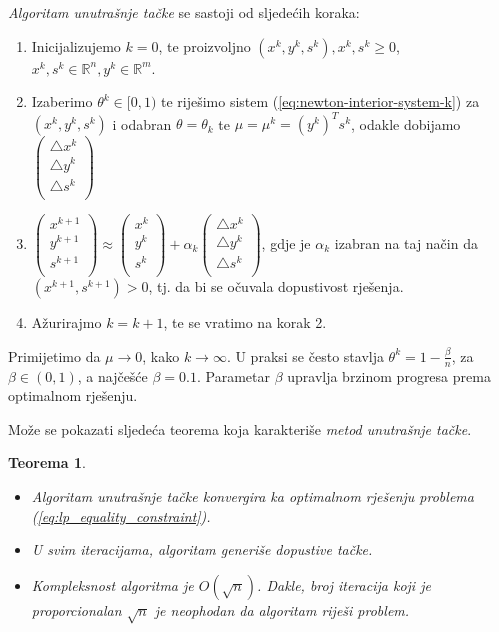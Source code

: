 \documentclass[a4paper, utf8, 11pt, colorlinks]{book}
\newtheorem{thm}{Teorema}
\begin{document}
\emph{Algoritam unutrašnje tačke} se sastoji od sljedećih koraka:
\begin{enumerate}
	\item Inicijalizujemo $k=0$, te proizvoljno  $(x^k, y^k, s^k), x^k, s^k \geq 0$, $x^k,s^k \in \mathbb{R}^n, y^k \in \mathbb{R}^m$.
	\item Izaberimo $ \theta^k \in [0, 1)$ te riješimo sistem (\ref{eq:newton-interior-system-k}) za $(x^k,y^k,s^k)$ i odabran $\theta = \theta_k$ te $\mu = \mu^k = (y^k)^T s^k $,  odakle   dobijamo
	$  
	\begin{pmatrix}
		\bigtriangleup x^k      \\
		\bigtriangleup y^k       \\
		\bigtriangleup s^k       \\
	\end{pmatrix}    
	$
	
	\item $ 
	\begin{pmatrix}
		x^{k+1}  \\
		y^{k+1}   \\
		s^{k+1}   \\
	\end{pmatrix} \approx
	\begin{pmatrix}
		x^k  \\
		y^k  \\
		s^k  \\
	\end{pmatrix} +   
	\alpha_k 
	\begin{pmatrix}
		\bigtriangleup x^k       \\
		\bigtriangleup y^k       \\
		\bigtriangleup s^k       \\
	\end{pmatrix}  
	$, gdje je $\alpha_k$ izabran na taj način da $(x^{k+1}, s^{k+1}) > 0$, tj. da bi se očuvala dopustivost rješenja. 
	\item Ažurirajmo $k = k + 1$, te se vratimo na korak 2.
\end{enumerate}
Primijetimo da $\mu \rightarrow 0$, kako $k \rightarrow \infty$. U praksi se često stavlja $\theta^k = 1 - \frac{\beta}{n}$, za $\beta \in (0,1)$, a najčešće $\beta= 0.1$.  Parametar $\beta$ upravlja brzinom progresa prema optimalnom rješenju.  


Može se pokazati sljedeća teorema koja karakteriše \emph{metod unutrašnje tačke}.

\begin{thm}
	\begin{itemize}
		\item Algoritam unutrašnje tačke konvergira ka optimalnom rješenju problema (\ref{eq:lp_equality_constraint}). %
		\item U svim iteracijama, algoritam generiše dopustive tačke.
		\item Kompleksnost algoritma je $O(\sqrt{n})$. Dakle,  broj iteracija koji je proporcionalan $\sqrt{n}$ je neophodan da algoritam riješi problem. 
	\end{itemize}
\end{thm}
\end{document}
